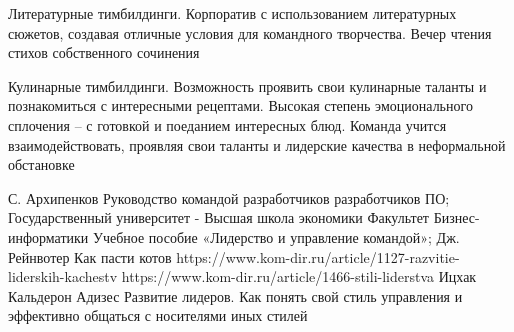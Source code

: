 \documentclass{../industrial-development}
\begin{document}
Литературные тимбилдинги. Корпоратив с использованием литературных сюжетов, создавая отличные условия для командного творчества. Вечер чтения стихов собственного сочинения

Кулинарные тимбилдинги. Возможность проявить свои кулинарные таланты и познакомиться с интересными рецептами. Высокая степень эмоционального сплочения – с готовкой и поеданием интересных блюд. Команда учится взаимодействовать, проявляя свои таланты и лидерские качества в неформальной обстановке




\begin{thebibliography}{99}


С. Архипенков Руководство командой разработчиков разработчиков ПО;
Государственный университет  - Высшая школа экономики Факультет Бизнес-информатики Учебное пособие «Лидерство и управление командой»;
Дж. Рейнвотер Как пасти котов 
https://www.kom-dir.ru/article/1127-razvitie-liderskih-kachestv
https://www.kom-dir.ru/article/1466-stili-liderstva
Ицхак Кальдерон Адизес Развитие лидеров. Как понять свой стиль управления и эффективно общаться с носителями иных стилей
\end{thebibliography}
\end{document}
